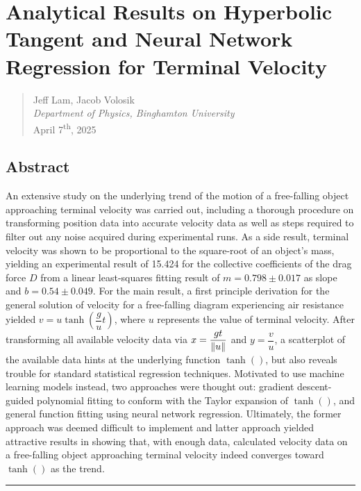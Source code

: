 \documentclass[12pt]{article}
\begin{document}

\section*{Analytical Results on Hyperbolic Tangent and Neural Network Regression for Terminal Velocity}

\begin{quote}
    Jeff Lam, Jacob Volosik \\
    \textit{Department of Physics, Binghamton University} \\
    April 7\textsuperscript{th}, 2025
\end{quote}

\subsection*{Abstract}
An extensive study on the underlying trend of the motion of a free-falling object approaching terminal velocity was carried out,
including a thorough procedure on transforming position data into accurate velocity data as well as steps required to filter out any noise acquired during experimental runs.
As a side result, terminal velocity was shown to be proportional to the square-root of an object's mass,
yielding an experimental result of 15.424 for the collective coefficients of the drag force $D$ from a linear least-squares fitting result of $m=0.798\pm0.017$ as slope and $b=0.54\pm0.049$.
For the main result, a first principle derivation for the general solution of velocity for a free-falling diagram experiencing air resistance yielded $v=u\tanh(\dfrac{g}{u}t)$,
where $u$ represents the value of terminal velocity.
After transforming all available velocity data via $x=\dfrac{gt}{\norm{u}}$ and $y=\dfrac{v}{u}$,
a scatterplot of the available data hints at the underlying function $\tanh()$, but also reveals trouble for standard statistical regression techniques.
Motivated to use machine learning models instead, two approaches were thought out: gradient descent-guided polynomial fitting to conform with the Taylor expansion of $\tanh()$,
and general function fitting using neural network regression.
Ultimately, the former approach was deemed difficult to implement and latter approach yielded attractive results in showing that, with enough data, calculated velocity data on a free-falling object approaching terminal velocity indeed converges toward $\tanh()$ as the trend.

\noindent\rule{\linewidth}{0.5pt}
\end{document}
